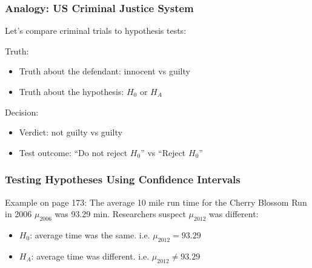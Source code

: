 \documentclass[handout]{beamer}
\newcommand{\blue}[1]{\textcolor{blue2}{#1}}
\newcommand{\xbar}{\overline{x}}
\begin{document}
\begin{frame}
\frametitle{Analogy:  US Criminal Justice System}

Let's compare criminal trials to hypothesis tests:

\vspace{0.5cm}

\pause \blue{Truth}:
\begin{itemize}
\item Truth about the defendant: innocent vs guilty
\item Truth about the hypothesis: $H_0$ or $H_A$
\end{itemize}

\vspace{0.25cm}

\pause \blue{Decision}:
\begin{itemize}
\item Verdict:  not guilty vs guilty
\item Test outcome: ``Do not reject $H_0$'' vs ``Reject $H_0$''
\end{itemize}

\end{frame}


\begin{frame}
\frametitle{Testing Hypotheses Using Confidence Intervals}
Example on page 173: The average 10 mile run time for the Cherry Blossom Run in 2006 $\mu_{2006}$ was 93.29 min.  Researchers suspect $\mu_{2012}$ was different:
\pause\begin{itemize}
\item $H_0$: average time was the same. i.e. $\mu_{2012} = 93.29$
\item $H_A$: average time was different. i.e. $\mu_{2012} \neq 93.29$
\end{itemize}

%
%
%
%
%

\end{frame}
\end{document}

